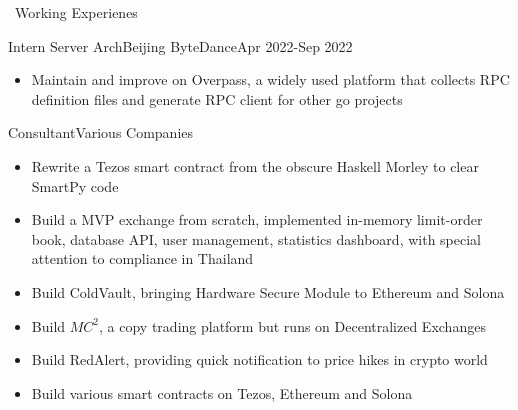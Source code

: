 \documentclass{resume}
\begin{document}
\begin{rSection}{\faUsers~Working Experienes}
\begin{rExperience}{Intern Server Arch}{Beijing ByteDance}{Apr 2022-Sep 2022}
\begin{itemize}
            \item Maintain and improve on Overpass, a widely used platform that collects RPC definition files and generate RPC client for other go projects
        \end{itemize}
    \end{rExperience}
    \begin{rExperience}{Consultant}{Various Companies}{~}
        \begin{itemize}
            \itemsep -0.5em \vspace{-0.5em}
            \item Rewrite a Tezos smart contract from the obscure Haskell Morley to clear SmartPy code
            \item Build a MVP exchange from scratch, implemented in-memory limit-order book, database API, user management, statistics dashboard, with special attention to compliance in Thailand
            \item Build ColdVault, bringing Hardware Secure Module to Ethereum and Solona
            \item Build $MC^{2}$, a copy trading platform but runs on Decentralized Exchanges
            \item Build RedAlert, providing quick notification to price hikes in crypto world
            \item Build various smart contracts on Tezos, Ethereum and Solona
        \end{itemize}
    \end{rExperience}
    

\end{rSection}
\end{document}
